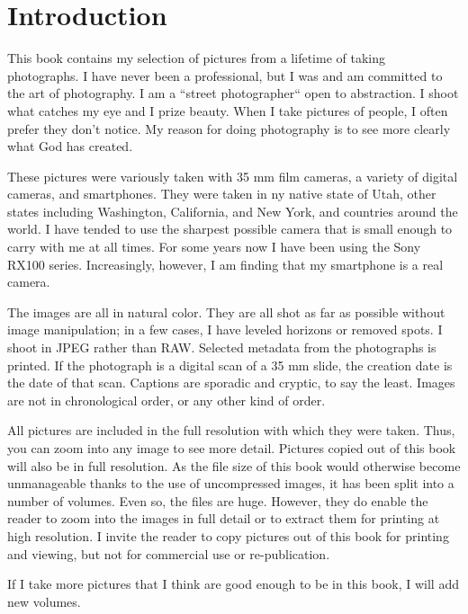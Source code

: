 \chapter{Introduction}

This book contains my selection of pictures from a lifetime of taking photographs. I have never been a professional, but I was and am committed to the art of photography. I am a ``street photographer`` open to abstraction. I shoot what catches my eye and I prize beauty. When I take pictures of people, I often prefer they don't notice. My reason for doing photography is to see more clearly what God has created.

These pictures were variously taken with 35 mm film cameras, a variety of digital cameras, and smartphones. They were taken in ny native state of Utah, other states including Washington, California, and New York, and countries around the world. I have tended to use the sharpest possible camera that is small enough to carry with me at all times. For some years now I have been using the Sony RX100 series. Increasingly, however, I am finding that my smartphone is a real camera.

The images are all in natural color. They are all shot as far as possible without image manipulation; in a few cases, I have leveled horizons or removed spots. I shoot in JPEG rather than RAW. Selected metadata from the photographs is printed. If the photograph is a digital scan of a 35 mm slide, the creation date is the date of that scan. Captions are sporadic and cryptic, to say the least. Images are not in chronological order, or any other kind of order.

All pictures are included in the full resolution with which they were taken. Thus, you can zoom into any image to see more detail. Pictures copied out of this book will also be in full resolution. As the file size of this book would otherwise become unmanageable thanks to the use of uncompressed images, it has been split into a number of volumes. Even so, the files are huge. However, they do enable the reader to zoom into the images in full detail or to extract them for printing at high resolution. I invite the reader to copy pictures out of this book for printing and viewing, but not for commercial use or re-publication. 

If I take more pictures that I think are good enough to be in this book, I will add new volumes.
